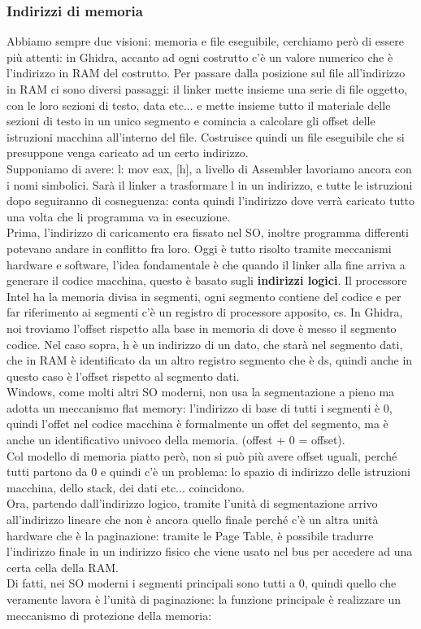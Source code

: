 \documentclass[12pt, oneside]{extbook}
\begin{document}
\subsubsection{Indirizzi di memoria}
Abbiamo sempre due visioni: memoria e file eseguibile, cerchiamo però di essere più attenti: in Ghidra, accanto ad ogni costrutto c'è un valore numerico che è l'indirizzo in RAM del costrutto. Per passare dalla posizione sul file all'indirizzo in RAM ci sono diversi passaggi: il linker mette insieme una serie di file oggetto, con le loro sezioni di testo, data etc... e mette insieme tutto il materiale delle sezioni di testo in un unico segmento e comincia a calcolare gli offset delle istruzioni macchina all'interno del file. Costruisce quindi un file eseguibile che si presuppone venga caricato ad un certo indirizzo.\\ Supponiamo di avere: \textsf{l: mov eax, [h]}, a livello di Assembler lavoriamo ancora con i nomi simbolici. Sarà il linker a trasformare l in un indirizzo, e tutte le istruzioni dopo seguiranno di cosneguenza: conta quindi l'indirizzo dove verrà caricato tutto una volta che li programma va in esecuzione.\\ Prima, l'indirizzo di caricamento era fissato nel SO, inoltre programma differenti potevano andare in conflitto fra loro. Oggi è tutto risolto tramite meccanismi hardware e software, l'idea fondamentale è che quando il linker alla fine arriva a generare il codice macchina, questo è basato sugli \textbf{indirizzi logici}. Il processore Intel ha la memoria divisa in segmenti, ogni segmento contiene del codice e per far riferimento ai segmenti c'è un registro di processore apposito, \textsf{cs}. In Ghidra, noi troviamo l'offset rispetto alla base in memoria di dove è messo il segmento codice. Nel caso sopra, h è un indirizzo di un dato, che starà nel segmento dati, che in RAM è identificato da un altro registro segmento che è \textsf{ds}, quindi anche in questo caso è l'offset rispetto al segmento dati.\\ Windows, come molti altri SO moderni, non usa la segmentazione a pieno ma adotta un meccanismo flat memory: l'indirizzo di base di tutti i segmenti è 0, quindi l'offet nel codice macchina è formalmente un offet del segmento, ma è anche un identificativo univoco della memoria. (offest + 0 = offset).\\ Col modello di memoria piatto però, non si può più avere offset uguali, perché tutti partono da 0 e quindi c'è un problema: lo spazio di indirizzo delle istruzioni macchina, dello stack, dei dati etc... coincidono.\\ Ora, partendo dall'indirizzo logico, tramite l'unità di segmentazione arrivo all'indirizzo lineare che non è ancora quello finale perché c'è un altra unità hardware che è la paginazione: tramite le Page Table, è possibile tradurre l'indirizzo finale in un indirizzo fisico che viene usato nel bus per accedere ad una certa cella della RAM.\\ Di fatti, nei SO moderni i segmenti principali sono tutti a 0, quindi quello che veramente lavora è l'unità di paginazione: la funzione principale è realizzare un meccanismo di protezione della memoria:
\end{document}
